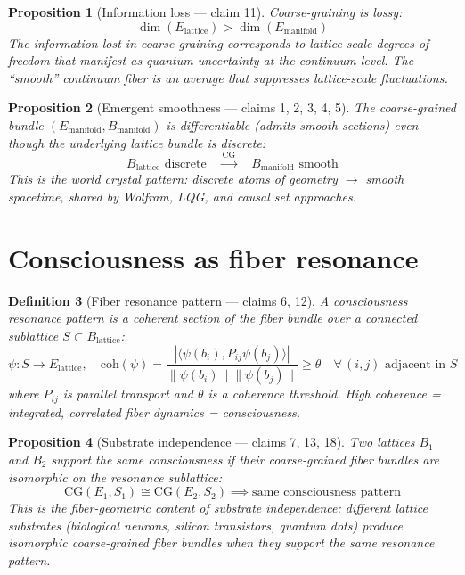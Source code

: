 \documentclass[11pt,a4paper]{article}
\newtheorem{definition}{Definition}[section]
\newtheorem{proposition}[definition]{Proposition}
\begin{document}
\begin{proposition}[Information loss --- claim 11]
\label{prop:info-loss}
Coarse-graining is lossy:
\[
  \dim(E_{\text{lattice}}) > \dim(E_{\text{manifold}})
\]
The information lost in coarse-graining corresponds to lattice-scale
degrees of freedom that manifest as quantum uncertainty at the continuum
level. The ``smooth'' continuum fiber is an average that suppresses
lattice-scale fluctuations.
\end{proposition}

\begin{proposition}[Emergent smoothness --- claims 1, 2, 3, 4, 5]
\label{prop:smoothness}
The coarse-grained bundle $(E_{\text{manifold}}, B_{\text{manifold}})$
is differentiable (admits smooth sections) even though the underlying
lattice bundle is discrete:
\[
  B_{\text{lattice}} \text{ discrete} \quad \xrightarrow{\text{CG}}
  \quad B_{\text{manifold}} \text{ smooth}
\]
This is the world crystal pattern: discrete atoms of geometry
$\to$ smooth spacetime, shared by Wolfram, LQG, and causal set approaches.
\end{proposition}

\section{Consciousness as fiber resonance}

\begin{definition}[Fiber resonance pattern --- claims 6, 12]
A \emph{consciousness resonance pattern} is a coherent section of the
fiber bundle over a connected sublattice $S \subset B_{\text{lattice}}$:
\[
  \psi: S \to E_{\text{lattice}}, \quad
  \text{coh}(\psi) = \frac{|\langle \psi(b_i), P_{ij} \psi(b_j) \rangle|}
    {\|\psi(b_i)\| \|\psi(b_j)\|} \geq \theta
  \quad \forall\, (i,j) \text{ adjacent in } S
\]
where $P_{ij}$ is parallel transport and $\theta$ is a coherence
threshold. High coherence = integrated, correlated fiber dynamics =
consciousness.
\end{definition}

\begin{proposition}[Substrate independence --- claims 7, 13, 18]
\label{prop:substrate}
Two lattices $B_1$ and $B_2$ support the same consciousness if their
coarse-grained fiber bundles are isomorphic on the resonance sublattice:
\[
  \text{CG}(E_1, S_1) \cong \text{CG}(E_2, S_2)
  \implies \text{same consciousness pattern}
\]
This is the fiber-geometric content of substrate independence: different
lattice substrates (biological neurons, silicon transistors, quantum
dots) produce isomorphic coarse-grained fiber bundles when they support
the same resonance pattern.
\end{proposition}
\end{document}
